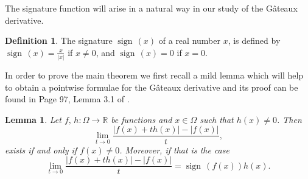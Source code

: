 \documentclass[a4paper,12pt,reqno]{amsart}%
\newtheorem{lemma}[theorem]{Lemma}
\theoremstyle{definition}
\newtheorem{definition}[theorem]{Definition}
\numberwithin{equation}{section}
\numberwithin{theorem}{section}
\newcommand{\ar}{\mathbb{R}}
\newcommand{\beq}{\begin{equation}}
\newcommand{\eq}{\end{equation}}
\DeclareMathOperator*{\sign}{sign\,}
\begin{document}
The signature function will arise in a natural way in our study of the  G\^ateaux derivative.
\begin{definition} The signature $\sign(x)$ of a real number $x$, is defined by  $\sign(x)=\frac{x}{|x|}$ if $x\neq 0$, and $\sign(x)=0$ if $x=0$. 
\end{definition}

In order to  prove the main theorem we first recall a mild lemma which will help to obtain a pointwise formulae for the  G\^ateaux derivative and its proof can be found in Page 97, Lemma 3.1 of \cite{detello}.

\begin{lemma}\label{lmain1a} Let $f,\, h:\Omega\rightarrow \ar$  be functions and $x\in\Omega$ such that $h(x)\neq 0$. Then 
\beq\lim\limits_{t\rightarrow 0}\frac{|f(x)+th(x)|-|f(x)|}{t},\label{j6nr}\eq
exists if and only if $f(x)\neq 0$. Moreover, if that is the case
\beq\lim\limits_{t\rightarrow 0}\frac{|f(x)+th(x)|-|f(x)|}{t}=\sign(f(x))h(x).\label{ftja46}\eq
\end{lemma}
\end{document}
